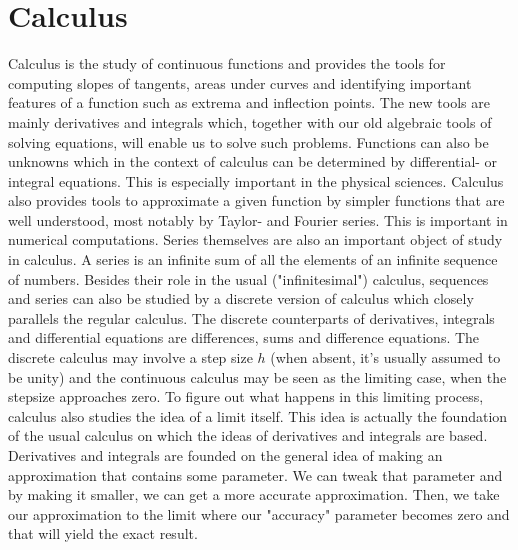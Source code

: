 \chapter{Calculus}
Calculus is the study of continuous functions and provides the tools for computing slopes of tangents, areas under curves and identifying important features of a function such as extrema and inflection points. The new tools are mainly derivatives and integrals which, together with our old algebraic tools of solving equations, will enable us to solve such problems. Functions can also be unknowns which in the context of calculus can be determined by differential- or integral equations. This is especially important in the physical sciences. Calculus also provides tools to approximate a given function by simpler functions that are well understood, most notably by Taylor- and Fourier series. This is important in numerical computations. Series themselves are also an important object of study in calculus. A series is an infinite sum of all the elements of an infinite sequence of numbers. Besides their role in the usual ("infinitesimal") calculus, sequences and series can also be studied by a discrete version of calculus which closely parallels the regular calculus. The discrete counterparts of derivatives, integrals and differential equations are differences, sums and difference equations. The discrete calculus may involve a step size $h$ (when absent, it's usually assumed to be unity) and the continuous calculus may be seen as the limiting case, when the stepsize approaches zero. To figure out what happens in this limiting process, calculus also studies the idea of a limit itself. This idea is actually the foundation of the usual calculus on which the ideas of derivatives and integrals are based. Derivatives and integrals are founded on the general idea of making an approximation that contains some parameter. We can tweak that parameter and by making it smaller, we can get a more accurate approximation. Then, we take our approximation to the limit where our "accuracy" parameter becomes zero and that will yield the exact result.






